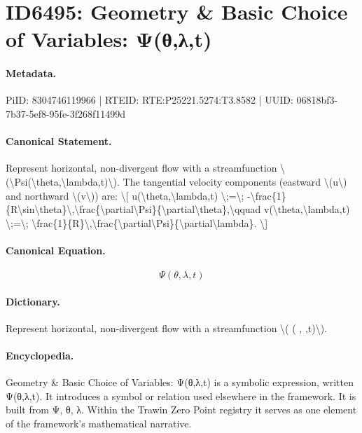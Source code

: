 \section*{ID6495: Geometry \& Basic Choice of Variables: Ψ(θ,λ,t)}
\paragraph{Metadata.}
PiID: 8304746119966 | RTEID: RTE:P25221.5274:T3.8582 | UUID: 06818bf3-7b37-5ef8-95fe-3f268f11499d

\paragraph{Canonical Statement.}
Represent horizontal, non-divergent flow with a streamfunction \textbackslash{}(\textbackslash{}Psi(\textbackslash{}theta,\textbackslash{}lambda,t)\textbackslash{}). The tangential velocity components (eastward \textbackslash{}(u\textbackslash{}) and northward \textbackslash{}(v\textbackslash{})) are: \textbackslash{}[ u(\textbackslash{}theta,\textbackslash{}lambda,t) \textbackslash{};=\textbackslash{}; -\textbackslash{}frac\{1\}\{R\textbackslash{}sin\textbackslash{}theta\}\textbackslash{},\textbackslash{}frac\{\textbackslash{}partial\textbackslash{}Psi\}\{\textbackslash{}partial\textbackslash{}theta\},\textbackslash{}qquad v(\textbackslash{}theta,\textbackslash{}lambda,t) \textbackslash{};=\textbackslash{}; \textbackslash{}frac\{1\}\{R\}\textbackslash{},\textbackslash{}frac\{\textbackslash{}partial\textbackslash{}Psi\}\{\textbackslash{}partial\textbackslash{}lambda\}. \textbackslash{}]

\paragraph{Canonical Equation.}
\[
\Psi(\theta,\lambda,t)
\]

\paragraph{Dictionary.}
Represent horizontal, non-divergent flow with a streamfunction \textbackslash{}( ( , ,t)\textbackslash{}).

\paragraph{Encyclopedia.}
Geometry \& Basic Choice of Variables: Ψ(θ,λ,t) is a symbolic expression, written Ψ(θ,λ,t). It introduces a symbol or relation used elsewhere in the framework. It is built from Ψ, θ, λ. Within the Trawin Zero Point registry it serves as one element of the framework's mathematical narrative.

